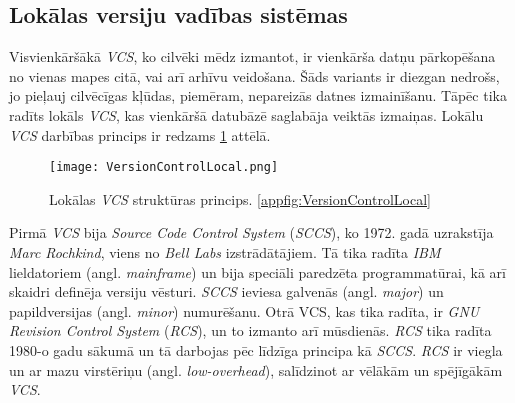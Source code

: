 \subsection{Lokālas versiju vadības sistēmas}
Visvienkāršākā \textit{VCS}, ko cilvēki mēdz izmantot, ir vienkārša datņu pārkopēšana no vienas mapes citā, vai arī arhīvu veidošana. Šāds variants ir diezgan nedrošs, jo pieļauj cilvēcīgas kļūdas, piemēram, nepareizās datnes izmainīšanu. Tāpēc tika radīts lokāls \textit{VCS}, kas vienkāršā datubāzē saglabāja veiktās izmaiņas. Lokālu \textit{VCS} darbības princips ir redzams \ref{fig:VersionControlLocal} attēlā.
\begin{figure}[H]%
	\centering
	\captionsetup{justification=centering}
	\texttt{[image: VersionControlLocal.png]}
	\caption{Lokālas \textit{VCS} struktūras princips. \ref{appfig:VersionControlLocal}}
	\label{fig:VersionControlLocal}
\end{figure}
Pirmā \textit{VCS} bija \textit{Source Code Control System} (\textit{SCCS}), ko 1972. gadā uzrakstīja \textit{Marc Rochkind}, viens no \textit{Bell Labs} izstrādātājiem. Tā tika radīta \textit{IBM} lieldatoriem (angl. \textit{mainframe}) un bija speciāli paredzēta programmatūrai, kā arī skaidri definēja versiju vēsturi. \textit{SCCS} ieviesa galvenās (angl. \textit{major}) un papildversijas (angl. \textit{minor}) numurēšanu.
Otrā VCS, kas tika radīta, ir \textit{GNU Revision Control System} (\textit{RCS}), un to izmanto arī mūsdienās. \textit{RCS} tika radīta 1980-o gadu sākumā un tā darbojas pēc līdzīga principa kā \textit{SCCS}. \textit{RCS} ir viegla un ar mazu virstēriņu (angl. \textit{low-overhead}), salīdzinot ar vēlākām un spējīgākām \textit{VCS}. \cite[LVCS]{chacon2014progit}

